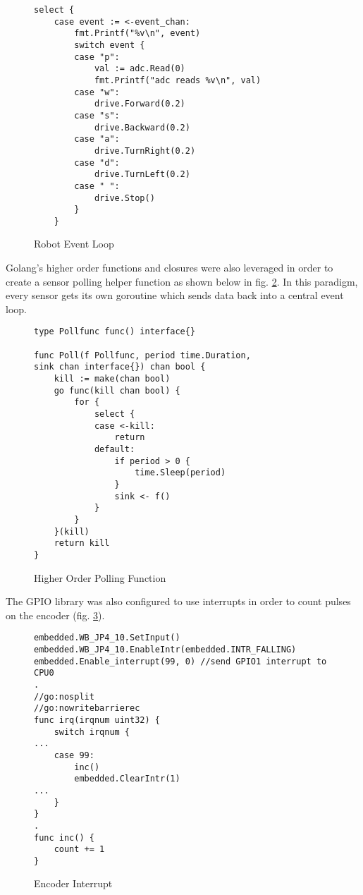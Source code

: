 \begin{figure}[h]
  \begin{center}
\begin{lstlisting}
select {
	case event := <-event_chan:
		fmt.Printf("%v\n", event)
		switch event {
		case "p":
			val := adc.Read(0)
			fmt.Printf("adc reads %v\n", val)
		case "w":
			drive.Forward(0.2)
		case "s":
			drive.Backward(0.2)
		case "a":
			drive.TurnRight(0.2)
		case "d":
			drive.TurnLeft(0.2)
		case " ":
			drive.Stop()
		}
	}
\end{lstlisting}
\end{center}
  \caption{Robot Event Loop} \label{fig:event_loop}
\end{figure}

\clearpage

Golang's higher order functions and closures were also leveraged in order to create a sensor polling helper function
as shown below in fig. \ref{fig:poll_func}. In this paradigm, every sensor gets its own goroutine which sends
data back into a central event loop.

\begin{figure}[h]
\begin{center}
\begin{lstlisting}
type Pollfunc func() interface{}

func Poll(f Pollfunc, period time.Duration,
sink chan interface{}) chan bool {
	kill := make(chan bool)
	go func(kill chan bool) {
		for {
			select {
			case <-kill:
				return
			default:
				if period > 0 {
					time.Sleep(period)
				}
				sink <- f()
			}
		}
	}(kill)
	return kill
}
\end{lstlisting}
\end{center}
  \caption{Higher Order Polling Function} \label{fig:poll_func}
\end{figure}

\clearpage
The GPIO library was also configured to use interrupts in order to count pulses on the encoder (fig. \ref{fig:encoder}).

\begin{figure}[h]
\begin{center}
\begin{lstlisting}
embedded.WB_JP4_10.SetInput()
embedded.WB_JP4_10.EnableIntr(embedded.INTR_FALLING)
embedded.Enable_interrupt(99, 0) //send GPIO1 interrupt to CPU0
.
//go:nosplit
//go:nowritebarrierec
func irq(irqnum uint32) {
	switch irqnum {
...
	case 99:
		inc()
		embedded.ClearIntr(1)
...
	}
}
.
func inc() {
	count += 1
}

\end{lstlisting}
\end{center}
  \caption{Encoder Interrupt} \label{fig:encoder}
\end{figure}


